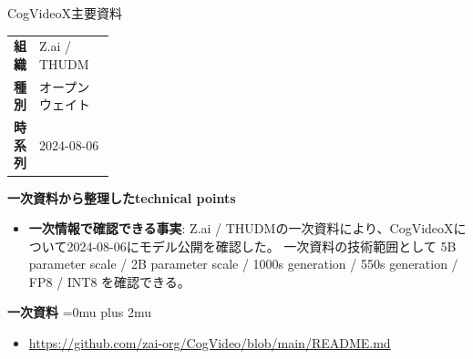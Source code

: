 \begin{technicalnote}{CogVideoX}{主要資料}
\begingroup
\begin{tabularx}{\linewidth}{@{}>{\bfseries}p{0.22\linewidth}X@{}}
組織 & Z.ai / THUDM \\
種別 & オープンウェイト \\
時系列 & 2024-08-06 \\
\end{tabularx}
\smallskip
{\bfseries 一次資料から整理したtechnical points}
\begin{itemize}[leftmargin=1.5em,itemsep=0.35em]
\item \textbf{一次情報で確認できる事実}: Z.ai / THUDMの一次資料により、CogVideoXについて2024-08-06にモデル公開を確認した。 一次資料の技術範囲として 5B parameter scale / 2B parameter scale / 1000s generation / 550s generation / FP8 / INT8 を確認できる。
\end{itemize}
\begin{minipage}{\linewidth}
\begin{samepage}
{\bfseries 一次資料}
\begingroup\sloppy
\Urlmuskip=0mu plus 2mu\relax
\begin{itemize}[leftmargin=1.5em,itemsep=0.25em]
\item {\scriptsize\url{https://github.com/zai-org/CogVideo/blob/main/README.md}}
\end{itemize}
\endgroup
\end{samepage}
\end{minipage}
\endgroup
\end{technicalnote}
\medskip

